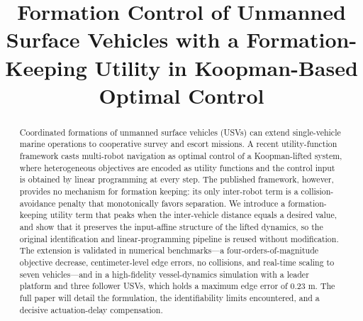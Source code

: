 \documentclass[conference]{IEEEtran}
\newcommand{\todo}[1]{\textcolor{red}{[#1]}}
\begin{document}
\title{Formation Control of Unmanned Surface Vehicles with a Formation-Keeping Utility in Koopman-Based Optimal Control}

\author{\IEEEauthorblockN{\todo{1st Author Name}}
\IEEEauthorblockA{\textit{\todo{dept.}} \\
\textit{\todo{organization}}\\
\todo{City, Country} \\
\todo{email}}
\and
\IEEEauthorblockN{\todo{2nd Author Name}}
\IEEEauthorblockA{\textit{\todo{dept.}} \\
\textit{\todo{organization}}\\
\todo{City, Country} \\
\todo{email}}
\and
\IEEEauthorblockN{\todo{3rd Author Name}}
\IEEEauthorblockA{\textit{\todo{dept.}} \\
\textit{\todo{organization}}\\
\todo{City, Country} \\
\todo{email}}
}

\maketitle

\begin{abstract}
Coordinated formations of unmanned surface vehicles (USVs) can extend single-vehicle marine operations to cooperative survey and escort missions. A recent utility-function framework casts multi-robot navigation as optimal control of a Koopman-lifted system, where heterogeneous objectives are encoded as utility functions and the control input is obtained by linear programming at every step. The published framework, however, provides no mechanism for formation keeping: its only inter-robot term is a collision-avoidance penalty that monotonically favors separation. We introduce a formation-keeping utility term that peaks when the inter-vehicle distance equals a desired value, and show that it preserves the input-affine structure of the lifted dynamics, so the original identification and linear-programming pipeline is reused without modification. The extension is validated in numerical benchmarks---a four-orders-of-magnitude objective decrease, centimeter-level edge errors, no collisions, and real-time scaling to seven vehicles---and in a high-fidelity vessel-dynamics simulation with a leader platform and three follower USVs, which holds a maximum edge error of 0.23 m. The full paper will detail the formulation, the identifiability limits encountered, and a decisive actuation-delay compensation.
\end{abstract}
\end{document}
